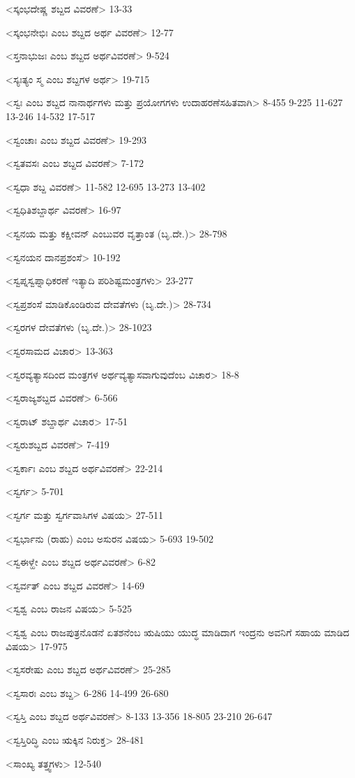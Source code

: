 <ಸ್ಕಂಭದೇಷ್ಣ ಶಬ್ದದ ವಿವರಣೆ>
13-33

<ಸ್ಕಂಭನೇಭಿಃ ಎಂಬ ಶಬ್ದದ ಅರ್ಥ ವಿವರಣೆ>
12-77

<ಸ್ತನಾಭುಜಃ ಎಂಬ ಶಬ್ದದ ಅರ್ಥವಿವರಣೆ>
9-524

<ಸ್ಯಃತ್ಯಂ ಸ್ಮ ಎಂಬ ಶಬ್ದಗಳ ಅರ್ಥ>
19-715

<ಸ್ವಃ ಎಂಬ ಶಬ್ದದ ನಾನಾರ್ಥಗಳು ಮತ್ತು ಪ್ರಯೋಗಗಳು ಉದಾಹರಣೆಸಹಿತವಾಗಿ>
8-455
9-225
11-627
13-246 
14-532
17-517

<ಸ್ವಂಚಾಃ ಎಂಬ ಶಬ್ದದ ವಿವರಣೆ>
19-293

<ಸ್ವತವಸಃ ಎಂಬ ಶಬ್ದದ ವಿವರಣೆ>
7-172

<ಸ್ವಧಾ ಶಬ್ದ ವಿವರಣೆ>
11-582 
12-695
13-273
13-402

<ಸ್ವಧಿತಿಶಬ್ದಾರ್ಥ ವಿವರಣೆ>
16-97

<ಸ್ವನಯ ಮತ್ತು ಕಕ್ಷೀವನ್‍ ಎಂಬುವರ ವೃತ್ತಾಂತ (ಬೃ.ದೇ.)>
28-798

<ಸ್ವನಯನ ದಾನಪ್ರಶಂಸೆ>
10-192

<ಸ್ವಪ್ನಸ್ವಪ್ನಾಧಿಕರಣೆ ಇತ್ಯಾದಿ ಪರಿಶಿಷ್ಟಮಂತ್ರಗಳು>
23-277

<ಸ್ವಪ್ರಶಂಸೆ ಮಾಡಿಕೊಂಡಿರುವ ದೇವತೆಗಳು (ಬೃ.ದೇ.)>
28-734

<ಸ್ವರಗಳ ದೇವತೆಗಳು (ಬೃ.ದೇ.)>
28-1023

<ಸ್ವರಸಾಮದ ವಿಚಾರ>
13-363

<ಸ್ವರವ್ಯತ್ಯಾಸದಿಂದ ಮಂತ್ರಗಳ ಅರ್ಥವ್ಯತ್ಯಾಸವಾಗುವುದೆಂಬ ವಿಚಾರ>
18-8

<ಸ್ವರಾಜ್ಯಶಬ್ದದ ವಿವರಣೆ>
6-566

<ಸ್ವರಾಟ್‍ ಶಬ್ದಾರ್ಥ ವಿಚಾರ>
17-51

<ಸ್ವರುಶಬ್ದದ ವಿವರಣೆ>
7-419

<ಸ್ವರ್ಕಾಃ ಎಂಬ ಶಬ್ದದ ಅರ್ಥವಿವರಣೆ>
22-214

<ಸ್ವರ್ಗ>
5-701

<ಸ್ವರ್ಗ ಮತ್ತು ಸ್ವರ್ಗವಾಸಿಗಳ ವಿಷಯ>
27-511

<ಸ್ವರ್ಭಾನು (ರಾಹು) ಎಂಬ ಅಸುರನ ವಿಷಯ>
5-693
19-502


<ಸ್ವಈಳ್ಹೇ ಎಂಬ ಶಬ್ದದ ಅರ್ಥವಿವರಣೆ>
6-82

<ಸ್ವರ್ವತ್‍ ಎಂಬ ಶಬ್ದದ ವಿವರಣೆ>
14-69

<ಸ್ವಶ್ವ ಎಂಬ ರಾಜನ ವಿಷಯ>
5-525

<ಸ್ವಶ್ವ ಎಂಬ ರಾಜಪುತ್ರನೊಡನೆ ಏತಶನೆಂಬ ಋಷಿಯು ಯುದ್ಧ ಮಾಡಿದಾಗ ಇಂದ್ರನು ಅವನಿಗೆ ಸಹಾಯ ಮಾಡಿದ ವಿಷಯ>
17-975

<ಸ್ವಸರೇಷು ಎಂಬ ಶಬ್ದದ ಅರ್ಥವಿವರಣೆ>
25-285

<ಸ್ವಸಾರಃ ಎಂಬ ಶಬ್ದ>
6-286 
14-499
26-680

<ಸ್ವಸ್ತಿ ಎಂಬ ಶಬ್ದದ ಅರ್ಥವಿವರಣೆ>
8-133
13-356 
18-805 
23-210
26-647


<ಸ್ವಸ್ತಿರಿದ್ಧಿ ಎಂಬ ಋಕ್ಕಿನ ನಿರುಕ್ತ>
28-481

<ಸಾಂಖ್ಯ ತತ್ತ್ವಗಳು>
12-540

